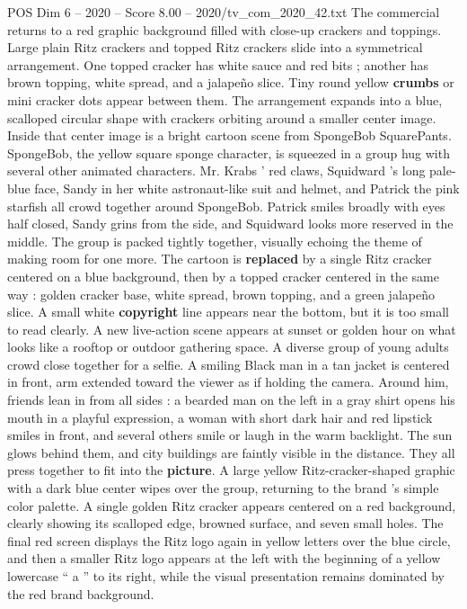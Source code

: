 \begin{textsample}{POS Dim 6 – 2020 – Score 8.00 – 2020/tv\_com\_2020\_42.txt}
The commercial returns to a red graphic background filled with close-up crackers and toppings.
Large plain Ritz crackers and topped Ritz crackers slide into a symmetrical arrangement.
One topped cracker has white sauce and red bits ; another has brown topping, white spread, and a jalapeño slice.
Tiny round yellow \textbf{crumbs} or mini cracker dots appear between them.
The arrangement expands into a blue, scalloped circular shape with crackers orbiting around a smaller center image.
Inside that center image is a bright cartoon scene from SpongeBob SquarePants.
SpongeBob, the yellow square sponge character, is squeezed in a group hug with several other animated characters.
Mr.
Krabs ’ red claws, Squidward ’s long pale-blue face, Sandy in her white astronaut-like suit and helmet, and Patrick the pink starfish all crowd together around SpongeBob.
Patrick smiles broadly with eyes half closed, Sandy grins from the side, and Squidward looks more reserved in the middle.
The group is packed tightly together, visually echoing the theme of making room for one more.
The cartoon is \textbf{replaced} by a single Ritz cracker centered on a blue background, then by a topped cracker centered in the same way : golden cracker base, white spread, brown topping, and a green jalapeño slice.
A small white \textbf{copyright} line appears near the bottom, but it is too small to read clearly.
A new live-action scene appears at sunset or golden hour on what looks like a rooftop or outdoor gathering space.
A diverse group of young adults crowd close together for a selfie.
A smiling Black man in a tan jacket is centered in front, arm extended toward the viewer as if holding the camera.
Around him, friends lean in from all sides : a bearded man on the left in a gray shirt opens his mouth in a playful expression, a woman with short dark hair and red lipstick smiles in front, and several others smile or laugh in the warm backlight.
The sun glows behind them, and city buildings are faintly visible in the distance.
They all press together to fit into the \textbf{picture}.
A large yellow Ritz-cracker-shaped graphic with a dark blue center wipes over the group, returning to the brand ’s simple color palette.
A single golden Ritz cracker appears centered on a red background, clearly showing its scalloped edge, browned surface, and seven small holes.
The final red screen displays the Ritz logo again in yellow letters over the blue circle, and then a smaller Ritz logo appears at the left with the beginning of a yellow lowercase “ a ” to its right, while the visual presentation remains dominated by the red brand background.

\end{textsample}
